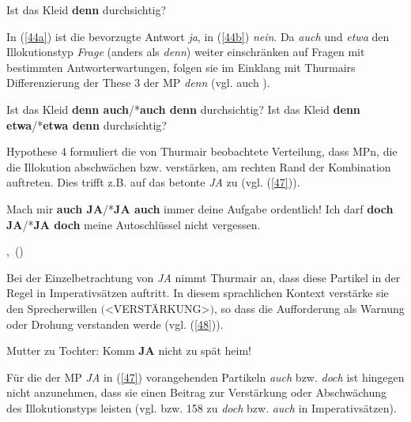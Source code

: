 \begin{exe}
	\ex\label{45} 
	Ist das Kleid \textbf{denn} durchsichtig?
\end{exe}						          
In (\ref{44a}) ist die bevorzugte Antwort \textit{ja}, in (\ref{44b}) \textit{nein}. Da \textit{auch} und\textit{ etwa} den Illokutionstyp  \textit{Frage}  (anders als \textit{denn}) weiter einschränken auf Fragen mit bestimmten Antworterwartungen, folgen sie im Einklang mit Thurmairs Differenzierung der These 3 der MP \textit{denn} (vgl. auch \citealt[238]{Dahl1988}).

\begin{exe}
	\ex\label{46} 
		\begin{xlist}	
			\ex\label{46a} Ist das Kleid \textbf{denn auch}/*\textbf{auch denn} durchsichtig?
			\ex\label{46b} Ist das Kleid \textbf{denn etwa}/*\textbf{etwa denn} durchsichtig?
		\end{xlist}
\end{exe}
Hypothese 4 formuliert die von Thurmair beobachtete Verteilung, dass MPn, die die Illokution abschwächen bzw. verstärken, am rechten Rand der Kombination auftreten. Dies trifft z.B. auf das betonte \textit{JA} zu (vgl. (\ref{47})).

\begin{exe}
	\ex\label{47} 
		\begin{xlist}	
			\ex\label{47a} Mach mir \textbf{auch JA}/*\textbf{JA auch} immer deine Aufgabe ordentlich!
			\ex\label{47b} Ich darf \textbf{doch JA}/*\textbf{JA doch} meine Autoschlüssel nicht vergessen.
		\end{xlist}
	\hfill\hbox{\citet[286]{Thurmair1989}, (\citeyear[109]{Thurmair1991})}	
\end{exe}
Bei der Einzelbetrachtung von \textit{JA} nimmt Thurmair an, dass diese Partikel in der Regel in Imperativsätzen  auftritt. In diesem sprachlichen Kontext verstärke sie den Sprecherwillen $($<VERSTÄRKUNG>$)$, so dass die Aufforderung als Warnung oder Drohung verstanden werde (vgl. (\ref{48})).

\begin{exe}
	\ex\label{48} 
	Mutter zu Tochter: Komm \textbf{JA} nicht zu spät heim!
	\hfill\hbox {\citet[109]{Thurmair1989}}
\end{exe}
Für die der MP \textit{JA} in (\ref{47}) vorangehenden Partikeln \textit{auch} bzw. \textit{doch} ist hingegen nicht anzunehmen, dass sie einen Beitrag zur Verstärkung oder Abschwächung des Illokutionstyps leisten (vgl. \citealt[118/119]{Thurmair1989} bzw. 158 zu \textit{doch} bzw. \textit{auch} in Imperativsätzen).

